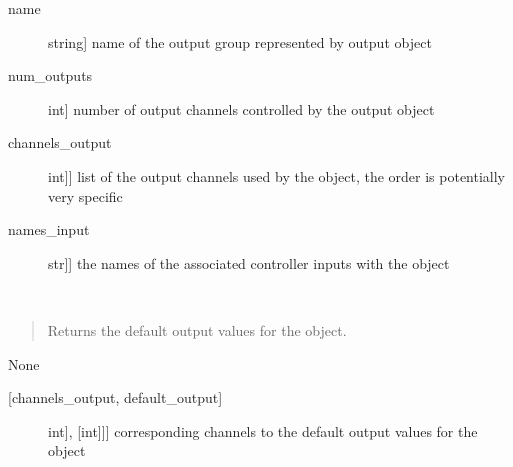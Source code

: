 \documentclass[letterpaper,10pt,english]{sphinxmanual}
\begin{document}
\begin{fulllineitems}
\begin{fulllineitems}
\sphinxAtStartPar
{}
\begin{description}
\item[{name}] \leavevmode{[}string{]}
\sphinxAtStartPar
name of the output group represented by output object

\item[{num\_outputs}] \leavevmode{[}int{]}
\sphinxAtStartPar
number of output channels controlled by the output object

\item[{channels\_output}] \leavevmode{[}{[}int{]}{]}
\sphinxAtStartPar
list of the output channels used by the object, the order is potentially very specific

\item[{names\_input}] \leavevmode{[}{[}str{]}{]}
\sphinxAtStartPar
the names of the associated controller inputs with the object

\end{description}

\end{fulllineitems}


\begin{fulllineitems}
\label{\detokenize{specific:EarOutput.EarOutput.get_default_outputs}}~\begin{quote}

\sphinxAtStartPar
Returns the default output values for the object.
\end{quote}

\sphinxAtStartPar
{}

\sphinxAtStartPar
None

\sphinxAtStartPar
{}
\begin{description}
\item[{{[}channels\_output, default\_output{]}}] \leavevmode{[}{[}{[}int{]}, {[}int{]}{]}{]}
\sphinxAtStartPar
corresponding channels to the default output values for the object

\end{description}

\end{fulllineitems}



\end{fulllineitems}
\end{document}
